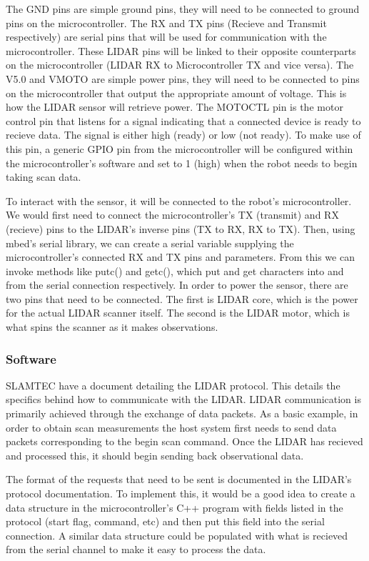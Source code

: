 				The GND pins are simple ground pins, they will need to be connected to ground pins on the microcontroller. The RX and TX pins (Recieve and Transmit respectively) are serial pins that will be used for communication with the microcontroller. These LIDAR pins will be linked to their opposite counterparts on the microcontroller (LIDAR RX to Microcontroller TX and vice versa). The V5.0 and VMOTO are simple power pins, they will need to be connected to pins on the microcontroller that output the appropriate amount of voltage. This is how the LIDAR sensor will retrieve power. The MOTOCTL pin is the motor control pin that listens for a signal indicating that a connected device is ready to recieve data. The signal is either high (ready) or low (not ready). To make use of this pin, a generic GPIO pin from the microcontroller will be configured within the microcontroller's software and set to 1 (high) when the robot needs to begin taking scan data.
			
				To interact with the sensor, it will be connected to the robot's microcontroller. We would first need to connect the microcontroller's TX (transmit) and RX (recieve) pins to the LIDAR's inverse pins (TX to RX, RX to TX). Then, using mbed's serial library, we can create a serial variable supplying the microcontroller's connected RX and TX pins and parameters. From this we can invoke methods like putc() and getc(), which put and get characters into and from the serial connection respectively. In order to power the sensor, there are two pins that need to be connected. The first is LIDAR core, which is the power for the actual LIDAR scanner itself. The second is the LIDAR motor, which is what spins the scanner as it makes observations. 
				
				\subsubsection{Software}
				SLAMTEC have a document detailing the LIDAR protocol. This details the specifics behind how to communicate with the LIDAR. LIDAR communication is primarily achieved through the exchange of data packets. As a basic example, in order to obtain scan measurements the host system first needs to send data packets corresponding to the begin scan command. Once the LIDAR has recieved and processed this, it should begin sending back observational data. 
				
				The format of the requests that need to be sent is documented in the LIDAR's protocol documentation\citep{rplidarprotocol}. To implement this, it would be a good idea to create a data structure in the microcontroller's C++ program with fields listed in the protocol (start flag, command, etc) and then put this field into the serial connection. A similar data structure could be populated with what is recieved from the serial channel to make it easy to process the data.
				

